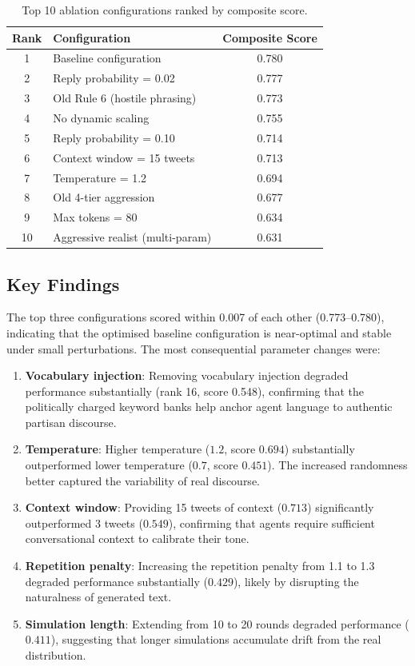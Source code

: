 \documentclass[logo,bsc,singlespacing,parskip,online]{infthesis}
\begin{document}
\begin{table}[ht]
\centering
\caption{Top 10 ablation configurations ranked by composite score.}
\label{tab:ablation}
\begin{tabular}{clc}
\toprule
\textbf{Rank} & \textbf{Configuration} & \textbf{Composite Score} \\
\midrule
1 & Baseline configuration           & 0.780 \\
2 & Reply probability = 0.02        & 0.777 \\
3 & Old Rule 6 (hostile phrasing)    & 0.773 \\
4 & No dynamic scaling               & 0.755 \\
5 & Reply probability = 0.10         & 0.714 \\
6 & Context window = 15 tweets       & 0.713 \\
7 & Temperature = 1.2                & 0.694 \\
8 & Old 4-tier aggression            & 0.677 \\
9 & Max tokens = 80                  & 0.634 \\
10 & Aggressive realist (multi-param) & 0.631 \\
\bottomrule
\end{tabular}
\end{table}

\subsection{Key Findings}

The top three configurations scored within 0.007 of each other (0.773--0.780), indicating that the optimised baseline configuration is near-optimal and stable under small perturbations. The most consequential parameter changes were:

\begin{enumerate}
\item \textbf{Vocabulary injection}: Removing vocabulary injection degraded performance substantially (rank 16, score 0.548), confirming that the politically charged keyword banks help anchor agent language to authentic partisan discourse.
\item \textbf{Temperature}: Higher temperature ($1.2$, score $0.694$) substantially outperformed lower temperature ($0.7$, score $0.451$). The increased randomness better captured the variability of real discourse.
\item \textbf{Context window}: Providing 15 tweets of context ($0.713$) significantly outperformed 3 tweets ($0.549$), confirming that agents require sufficient conversational context to calibrate their tone.
\item \textbf{Repetition penalty}: Increasing the repetition penalty from 1.1 to 1.3 degraded performance substantially ($0.429$), likely by disrupting the naturalness of generated text.
\item \textbf{Simulation length}: Extending from 10 to 20 rounds degraded performance ($0.411$), suggesting that longer simulations accumulate drift from the real distribution.
\end{enumerate}
\end{document}
